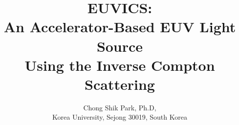 \documentclass[10pt]{article}
\title{\Large{\bf EUVICS}: \\
        \Large{\bf An Accelerator-Based EUV Light Source \\
        Using the Inverse Compton Scattering}}
\author{\large Chong Shik Park, Ph.D, \\
Korea University, Sejong 30019, South Korea}
\begin{document}
\maketitle
\tableofcontents
\newpage









{\small\raggedright


}
\end{document}
